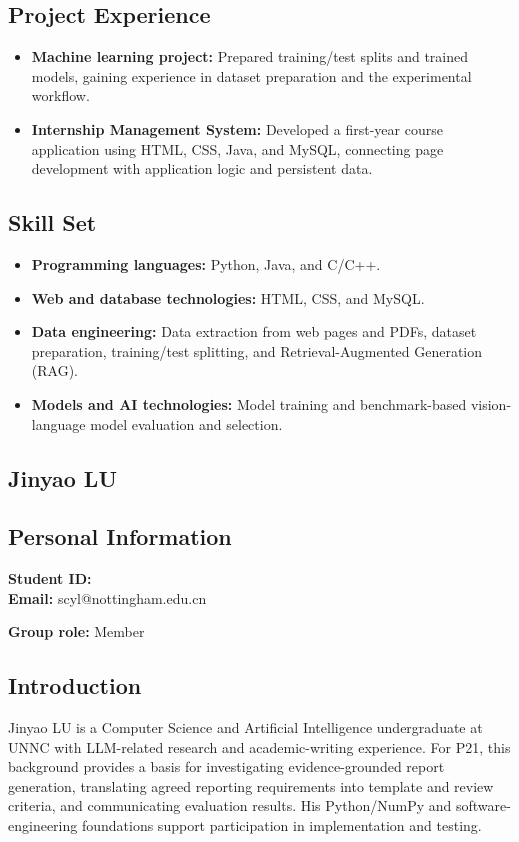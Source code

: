 \documentclass[a4paper,12pt]{article}
\newcommand{\PersonalInformation}[2]{%
  \subsection*{Personal Information}
  \if\relax\detokenize{#1}\relax\else
  \noindent\textbf{Student ID:} #1\\
  \fi
  \textbf{Email:} #2\par
}
\begin{document}
\subsection*{Project Experience}
\begin{itemize}
  \item \textbf{Machine learning project:} Prepared training/test splits and trained models, gaining experience in dataset preparation and the experimental workflow.
  \item \textbf{Internship Management System:} Developed a first-year course application using HTML, CSS, Java, and MySQL, connecting page development with application logic and persistent data.
\end{itemize}

\subsection*{Skill Set}
\begin{itemize}
  \item \textbf{Programming languages:} Python, Java, and C/C++.
  \item \textbf{Web and database technologies:} HTML, CSS, and MySQL.
  \item \textbf{Data engineering:} Data extraction from web pages and PDFs, dataset preparation, training/test splitting, and Retrieval-Augmented Generation (RAG).
  \item \textbf{Models and AI technologies:} Model training and benchmark-based vision-language model evaluation and selection.
\end{itemize}

\subsection{Jinyao LU}
\PersonalInformation{}{scyl@nottingham.edu.cn}
\noindent\textbf{Group role:} Member\par

\subsection*{Introduction}
Jinyao LU is a Computer Science and Artificial Intelligence undergraduate at UNNC with LLM-related research and academic-writing experience. For P21, this background provides a basis for investigating evidence-grounded report generation, translating agreed reporting requirements into template and review criteria, and communicating evaluation results. His Python/NumPy and software-engineering foundations support participation in implementation and testing.
\end{document}
